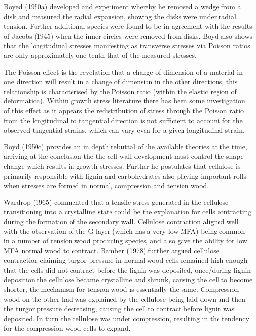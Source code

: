 \documentclass{article}
\begin{document}
Boyed (1950a) developed and experiment whereby he removed a wedge from a disk
and measured the radial expansion, showing the disks were under radial
tension. Further additional species were found to be in agreement with the
results of Jacobs (1945) when the inner circles were removed from disks. Boyd also shows
that the longitudinal stresses manifesting as transverse stresses via Poisson
ratios are only approximately one tenth that of the measured stresses.

The Poisson effect is the revelation that a change of dimension of a material
in one direction will result in a change of dimension in the other directions,
this relationship is characterised by the Poisson ratio (within the elastic
region of deformation). Within growth stress literature there has been some
investigation of this effect as it appears the redistribution of stress through
the Poisson ratio from the longitudinal to tangential direction is not
sufficient to account for the observed tangential strains, which can vary even
for a given longitudinal strain.

Boyd (1950c) provides an in depth rebuttal of the available theories at the
time, arriving at the conclusion the the cell wall development must control the shape
change which results in growth stresses. Further he postulates that cellulose
is primarily responsible with lignin and carbohydrates also playing important
rolls when stresses are formed in normal, compression and tension wood.

Wardrop (1965) commented that a tensile stress generated in the cellulose
transitioning into a crystalline state could be the explanation for cells
contracting during the formation of the secondary wall. Cellulose contraction
aligned well with the observation of the G-layer (which has  a very low
MFA) being common in a number of tension wood producing species, and also gave
the ability for low MFA normal wood to contract. Bamber (1978) further argued
cellulose contraction claiming turgor pressure in normal wood cells remained
high enough that the cells did not contract before the lignin was deposited,
once/during lignin deposition the cellulose became crystalline and shrunk,
causing the cell to become shorter, the mechanism for tension wood is
essentially the same. Compression wood on the other had was explained by the
cellulose being laid down and then the turgor pressure decreasing, causing the
cell to contract before lignin was deposited. In turn the cellulose was under
compression, resulting in the tendency for the compression wood cells to
expand.
\end{document}
